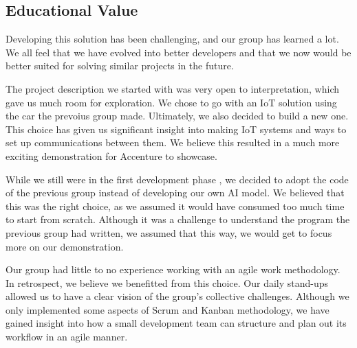 \subsection{Educational Value}
Developing this solution has been challenging, and our group has learned a lot. We all feel that we have evolved into better developers and that we now would be better suited for solving similar projects in the future. 

The project description we started with was very open to interpretation, which gave us much room for exploration. We chose to go with an IoT solution using the car the prevoius group made. Ultimately, we also decided to build a new one. This choice has given us significant insight into making IoT systems and ways to set up communications between them. We believe this resulted in a much more exciting demonstration for Accenture to showcase.

While we still were in the first development phase , we decided to adopt the code of the previous group instead of developing our own AI model. We believed that this was the right choice, as we assumed it would have consumed too much time to start from scratch. Although it was a challenge to understand the program the previous group had written, we assumed that this way, we would get to focus more on our demonstration.

Our group had little to no experience working with an agile work methodology. In retrospect, we believe we benefitted from this choice. Our daily stand-ups allowed us to have a clear vision of the group's collective challenges. Although we only implemented some aspects of Scrum and Kanban methodology, we have gained insight into how a small development team can structure and plan out its workflow in an agile manner.